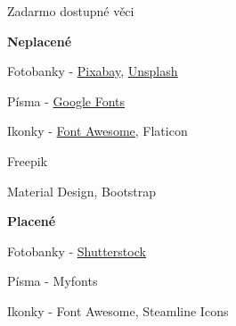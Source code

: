 \documentclass[aspectratio=1610]{beamer}
\begin{document}
\begin{frame}{Zadarmo dostupné věci}
    \begin{multicols}{2}
        \centering

        \begin{cardTiny}
            \begin{flushleft}
                \textbf{Neplacené}

                \vspace{2ex}
                Fotobanky - \href{https://pixabay.com/cs/}{Pixabay}, \href{https://unsplash.com}{Unsplash}

                \vspace{2ex}
                Písma - \href{https://fonts.google.com/}{Google Fonts}
                
                \vspace{2ex}
                Ikonky - \href{https://fontawesome.com}{Font Awesome}, Flaticon
                
                \vspace{2ex}
                Freepik

                \vspace{2ex}
                Material Design, Bootstrap
            \end{flushleft}
        \end{cardTiny}
        \begin{cardTiny}
            \begin{flushleft}
                \textbf{Placené}

                \vspace{2ex}
                Fotobanky - \href{https://www.shutterstock.com/cs/}{Shutterstock}

                \vspace{2ex}
                Písma - Myfonts
                
                \vspace{2ex}
                Ikonky - Font Awesome, Steamline Icons
            \end{flushleft}
        \end{cardTiny}
    \end{multicols}
\end{frame}
\end{document}
